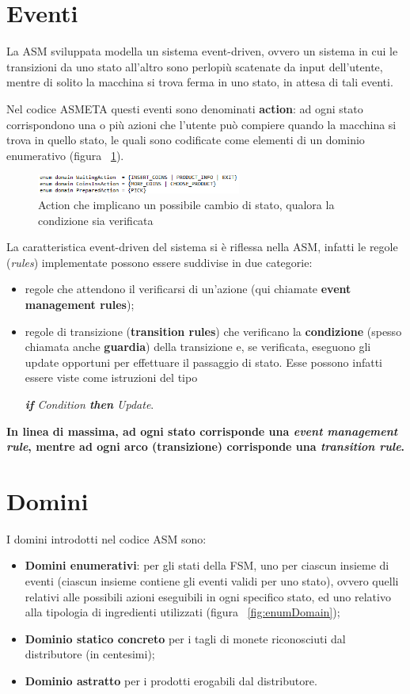 \newpage
\section{Eventi}
La ASM sviluppata modella un sistema event-driven, ovvero un sistema in cui le transizioni da uno stato all’altro sono perlopiù scatenate da input dell’utente, mentre di solito la macchina si trova ferma in uno stato, in attesa di tali eventi.

Nel codice ASMETA questi eventi sono denominati \textbf{action}: ad ogni stato corrispondono una o più azioni che l’utente può compiere quando la macchina si trova in quello stato, le quali sono codificate come elementi di un dominio enumerativo (figura ~\ref{fig:actionASM}).

\begin{figure}[h]
	\centering
	\includegraphics[width=0.6\textwidth]{Immagini/ActionASM.png}
	\caption{Action che implicano un possibile cambio di stato, qualora la condizione sia verificata}
	\label{fig:actionASM}
\end{figure}

La caratteristica event-driven del sistema si è riflessa nella ASM, infatti le regole (\textit{rules}) implementate possono essere suddivise in due categorie:
\begin{itemize}
	\item  regole che attendono il verificarsi di un’azione (qui chiamate \textbf{event management rules});
	\item regole di transizione (\textbf{transition rules}) che verificano la \textbf{condizione} (spesso chiamata anche \textbf{guardia}) della transizione e, se verificata, eseguono gli update opportuni per effettuare il passaggio di stato. Esse possono infatti essere viste come istruzioni del tipo 
	
	\textit{\textbf{if} Condition \textbf{then} Update}.
\end{itemize}
	
\textbf{In linea di massima, ad ogni stato corrisponde una \textit{event management rule}, mentre ad ogni arco (transizione) corrisponde una \textit{transition rule}.}

\section{Domini}
I domini introdotti nel codice ASM sono:
\begin{itemize}
	\item \textbf{Domini enumerativi}: per gli stati della FSM, uno per ciascun insieme di eventi (ciascun insieme contiene gli eventi validi per uno stato), ovvero quelli relativi alle possibili azioni eseguibili in ogni specifico stato, ed uno relativo alla tipologia di ingredienti utilizzati (figura ~\ref{fig:enumDomain});
	\item \textbf{Dominio statico concreto} per i tagli di monete riconosciuti dal distributore (in centesimi);
	\item \textbf{Dominio astratto} per i prodotti erogabili dal distributore.
\end{itemize}

